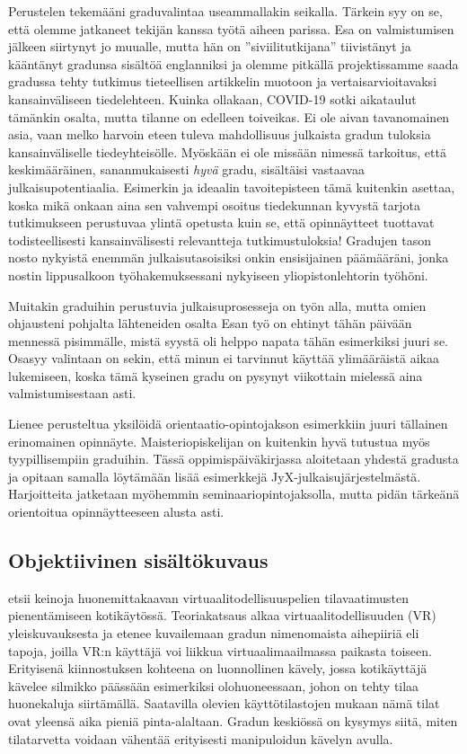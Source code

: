 \documentclass[utf8]{gradu3}
\begin{document}
Perustelen tekemääni graduvalintaa useammallakin seikalla. Tärkein syy on se,
että olemme jatkaneet tekijän kanssa työtä aiheen parissa. Esa on valmistumisen
jälkeen siirtynyt jo muualle, mutta hän on ''siviilitutkijana'' tiivistänyt ja
kääntänyt gradunsa sisältöä englanniksi ja olemme pitkällä projektissamme saada
gradussa tehty tutkimus tieteellisen artikkelin muotoon ja vertaisarvioitavaksi
kansainväliseen tiedelehteen. Kuinka ollakaan, COVID-19 sotki aikataulut
tämänkin osalta, mutta tilanne on edelleen toiveikas. Ei ole aivan tavanomainen
asia, vaan melko harvoin eteen tuleva mahdollisuus julkaista gradun tuloksia
kansainväliselle tiedeyhteisölle. Myöskään ei ole missään nimessä tarkoitus,
että keskimääräinen, sananmukaisesti \emph{hyvä} gradu, sisältäisi vastaavaa
julkaisupotentiaalia. Esimerkin ja ideaalin tavoitepisteen tämä kuitenkin
asettaa, koska mikä onkaan aina sen vahvempi osoitus tiedekunnan kyvystä tarjota
tutkimukseen perustuvaa ylintä opetusta kuin se, että opinnäytteet tuottavat
todisteellisesti kansainvälisesti relevantteja tutkimustuloksia! Gradujen tason
nosto nykyistä enemmän julkaisutasoisiksi onkin ensisijainen päämääräni, jonka
nostin lippusalkoon työhakemuksessani nykyiseen yliopistonlehtorin työhöni.

Muitakin graduihin perustuvia julkaisuprosesseja on työn alla, mutta omien
ohjausteni pohjalta lähteneiden osalta Esan työ on ehtinyt tähän päivään
mennessä pisimmälle, mistä syystä oli helppo napata tähän esimerkiksi juuri se.
Osasyy valintaan on sekin, että minun ei tarvinnut käyttää ylimääräistä aikaa
lukemiseen, koska tämä kyseinen gradu on pysynyt viikottain mielessä aina
valmistumisestaan asti.

Lienee perusteltua yksilöidä orientaatio-opintojakson esimerkkiin juuri
tällainen erinomainen opinnäyte. Maisteriopiskelijan on kuitenkin hyvä tutustua
myös tyypillisempiin graduihin. Tässä oppimispäiväkirjassa aloitetaan yhdestä
gradusta ja opitaan samalla löytämään lisää esimerkkejä
JyX-julkaisujärjestelmästä. Harjoitteita jatketaan myöhemmin
seminaariopintojaksolla, mutta pidän tärkeänä orientoitua opinnäytteeseen alusta
asti.

\subsection{Objektiivinen sisältökuvaus}

\textcite{Hiiva2018vr}
etsii keinoja huonemittakaavan virtuaalitodellisuuspelien tilavaatimusten
pienentämiseen kotikäytössä. Teoriakatsaus alkaa virtuaalitodellisuuden (VR)
yleiskuvauksesta ja etenee kuvailemaan gradun nimenomaista aihepiiriä eli
tapoja, joilla VR:n käyttäjä voi liikkua virtuaalimaailmassa paikasta toiseen.
Erityisenä kiinnostuksen kohteena on luonnollinen kävely, jossa kotikäyttäjä
kävelee silmikko päässään esimerkiksi olohuoneessaan, johon on tehty tilaa
huonekaluja siirtämällä. Saatavilla olevien käyttötilastojen mukaan nämä tilat
ovat yleensä aika pieniä pinta-alaltaan. Gradun keskiössä on kysymys siitä,
miten tilatarvetta voidaan vähentää erityisesti manipuloidun kävelyn avulla.
\end{document}
